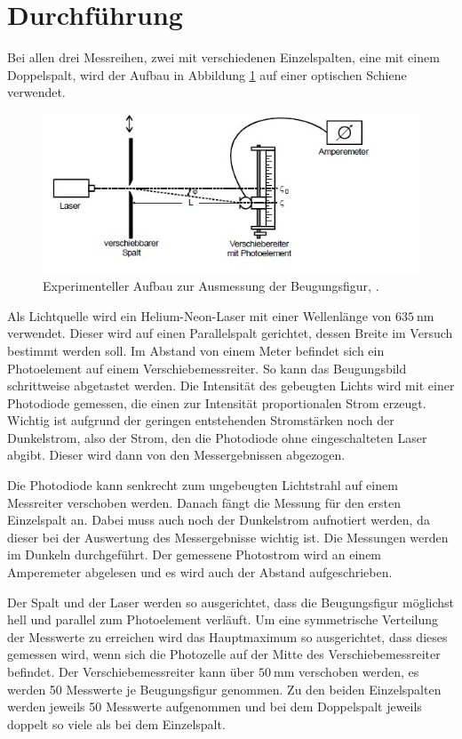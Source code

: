  \section{Durchführung}
\label{sec:Durchführung}
Bei allen drei Messreihen, zwei mit verschiedenen Einzelspalten, eine mit einem Doppelspalt, wird der Aufbau in Abbildung \ref{fig:experimentelleraufbau} auf einer optischen Schiene verwendet.
\begin{figure}[h!]
	\centering
	\includegraphics[width=0.9\linewidth]{experimentelleraufbau.jpg}
	\caption{Experimenteller Aufbau zur Ausmessung der Beugungsfigur, \cite[7]{anleitung406}.}
	\label{fig:experimentelleraufbau}
\end{figure}
Als Lichtquelle wird ein Helium-Neon-Laser mit einer Wellenlänge von $\SI{635}{\nano\metre}$ verwendet. Dieser wird auf einen Parallelspalt gerichtet, dessen Breite im Versuch bestimmt werden soll. Im Abstand von einem Meter befindet sich ein Photoelement auf einem Verschiebemessreiter. So kann das Beugungsbild schrittweise abgetastet werden. Die Intensität des gebeugten Lichts wird mit einer Photodiode gemessen, die einen zur Intensität proportionalen Strom erzeugt. Wichtig ist aufgrund der geringen entstehenden Stromstärken noch der Dunkelstrom, also der Strom, den die Photodiode ohne eingeschalteten Laser abgibt. Dieser wird dann von den Messergebnissen abgezogen.

Die Photodiode kann senkrecht zum ungebeugten Lichtstrahl auf einem Messreiter verschoben werden. Danach fängt die Messung für den ersten Einzelspalt an. Dabei muss auch noch der Dunkelstrom aufnotiert werden, da dieser bei der Auswertung des Messergebnisse wichtig ist. Die Messungen werden im Dunkeln durchgeführt. Der gemessene Photostrom wird an einem Amperemeter abgelesen und es wird auch der Abstand aufgeschrieben. 

Der Spalt und der Laser werden so ausgerichtet, dass die Beugungsfigur möglichst hell und parallel zum Photoelement verläuft. Um eine symmetrische Verteilung der Messwerte zu erreichen wird das Hauptmaximum so ausgerichtet, dass dieses gemessen wird, wenn sich die Photozelle auf der Mitte des Verschiebemessreiter befindet. Der Verschiebemessreiter kann über $\SI{50}{\milli\meter}$ verschoben werden, es werden 50 Messwerte je Beugungsfigur genommen. Zu den beiden Einzelspalten werden jeweils 50 Messwerte aufgenommen und bei dem Doppelspalt jeweils doppelt so viele als bei dem Einzelspalt.
